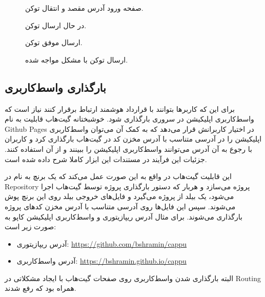 \begin{figure}[H]
\centerline{}
\caption{صفحه ورود آدرس مقصد و انتقال توکن.}
\label{fig:transfer-modal}
\end{figure}

\begin{figure}[H]
\centerline{}
\caption{در حال ارسال توکن.}
\label{fig:transfer-loading}
\end{figure}

\begin{figure}[H]
\centerline{}
\caption{ارسال موفق توکن.}
\label{fig:transfer-success}
\end{figure}

\begin{figure}[H]
\centerline{}
\caption{ارسال توکن با مشکل مواجه شده.}
\label{fig:transfer-error}
\end{figure}


\subsection{بارگذاری واسط‌کاربری}
برای این که کاربرها بتوانند با قرارداد هوشمند ارتباط برقرار کنند نیاز است که واسط‌کاربری اپلیکیشن در سروری بارگذاری شود.
خوشبختانه گیت‌هاب قابلیت به نام
\gls{Github Pages}
در اختیار کاربرانش قرار می‌دهد
که به کمک آن می‌توان واسط‌کاربری اپلیکیشن را در آدرسی متناسب با آدرس مخزن کد در گیت‌هاب بارگذاری کرد
و کاربران با رجوع به آن آدرس می‌توانند واسط‌کاربری اپلیکیشن را ببینند و از آن استفاده کنند.
جزئیات این فرآیند در مستندات این ابزار
\cite{GithubPages}
کاملا شرح داده شده است.

این قابلیت گیت‌هاب در واقع به این صورت عمل می‌کند که یک برنچ به نام
در
\gls{Repository}
پروژه می‌سازد و هربار که دستور بارگذاری پروژه توسط گیت‌هاب اجرا می‌شود،
یک بیلد از پروژه می‌گیرد و فایل‌های خروجی بیلد روی این برنچ پوش می‌شوند.
سپس این فایل‌ها روی آدرسی متناسب با آدرس مخزن کد‌های پروژه بارگذاری می‌شوند.
برای مثال آدرس ریپازیتوری و واسط‌کاربری اپلیکیشن کاپو به صورت زیر است:
\begin{itemize}
  \item
  آدرس ریپازیتوری: \url{https://github.com/bshramin/cappu}
  \item
  آدرس واسط‌کاربری: \url{https://bshramin.github.io/cappu}
\end{itemize}
البته بارگذاری شدن واسط‌کاربری روی صفحات گیت‌هاب با ایجاد مشکلاتی در
\gls{Routing}
همراه بود که رفع شدند.


